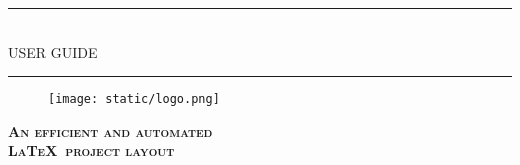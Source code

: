 \begin{titlepage}

  \begin{center}

    \noindent\rule{\textwidth}{1pt}
    \\[0.25cm]
    {
    \fontsize{35pt}{35pt}\selectfont
    {
      USER GUIDE
    }
    }
    \noindent\rule{\textwidth}{1pt}

    \vspace{2cm}
    \begin{figure}[h]
      \centering
      \texttt{[image: static/logo.png]}
    \end{figure}
    \vspace{1.5cm}

    \textsc{\large
      \textbf{An efficient and automated\\ \LaTeX \ project layout}
    }\\[0.25cm]

  \end{center}
\end{titlepage}
